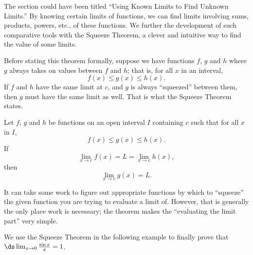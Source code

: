 The section could have been titled ``Using Known Limits to Find Unknown Limits.'' By knowing certain limits of functions, we can find limits involving sums, products, powers, etc., of these functions. We further the development of such comparative tools with the Squeeze Theorem, a clever and intuitive way to find the value of some limits. 

Before stating this theorem formally, suppose we have functions $f$, $g$ and $h$ where $g$ always takes on values between $f$ and $h$; that is, for all $x$ in an interval, $$f(x) \leq g(x) \leq h(x).$$ If $f$ and $h$ have the same limit at $c$, and $g$  is always ``squeezed'' between them, then $g$ must have the same limit as well. That is what the Squeeze Theorem states.

{Let $f$, $g$ and $h$ be functions on an open interval $I$ containing $c$ such that for all $x$ in $I$, $$f(x)\leq g(x) \leq h(x).$$ If $$\lim_{x\to c} f(x) = L = \lim_{x\to c} h(x),$$ then $$\lim_{x\to c} g(x) = L.$$ 
}

It can take some work to figure out appropriate functions by which to ``squeeze'' the given function you are trying to evaluate a limit of. However, that is generally the only place work is necessary; the theorem makes the ``evaluating the limit part'' very simple. 

We use the Squeeze Theorem in the following example to finally prove that $\ds \lim_{x\to 0} \frac{\sin x}{x} = 1$.\\

